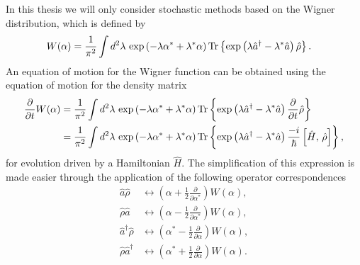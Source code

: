 In this thesis we will only consider stochastic methods based on the Wigner distribution, which is defined by \citep{Scully}
\begin{align}
    W(\alpha) &= \frac{1}{\pi^2} \int d^2 \lambda\, \exp\left(-\lambda \alpha^* + \lambda^* \alpha\right) \operatorname{Tr}\left\{ \exp\left(\lambda \hat{a}^\dagger - \lambda^* \hat{a}\right) \hat{\rho} \right\}.
\end{align}
An equation of motion for the Wigner function can be obtained using the equation of motion for the density matrix
\begin{align}
    \frac{\partial}{\partial t} W(\alpha) &= \frac{1}{\pi^2} \int d^2 \lambda\, \exp\left(-\lambda \alpha^* + \lambda^* \alpha\right) \operatorname{Tr}\left\{ \exp\left(\lambda \hat{a}^\dagger - \lambda^* \hat{a}\right) \frac{\partial}{\partial t}\hat{\rho}\right\} \notag \\
    &= \frac{1}{\pi^2} \int d^2 \lambda\, \exp\left(-\lambda \alpha^* + \lambda^* \alpha\right) \operatorname{Tr}\left\{ \exp\left(\lambda \hat{a}^\dagger - \lambda^* \hat{a}\right) \frac{-i}{\hbar} \left[\hat{H},\, \hat{\rho} \right]\right\},
\end{align}
for evolution driven by a Hamiltonian $\hat{H}$.  The simplification of this expression is made easier through the application of the following operator correspondences \citep[\S 4.5]{GardinerQN}
\begin{subequations}
    \begin{align}
        \hat{a} \hat{\rho} &\leftrightarrow \left(\alpha + \frac{1}{2} \frac{\partial}{\partial \alpha^*} \right) W(\alpha), \\
        \hat{\rho} \hat{a} & \leftrightarrow \left(\alpha - \frac{1}{2} \frac{\partial}{\partial \alpha^*} \right) W(\alpha), \\
        \hat{a}^\dagger \hat{\rho} & \leftrightarrow \left( \alpha^* - \frac{1}{2} \frac{\partial}{\partial \alpha} \right) W(\alpha), \\
        \hat{\rho} \hat{a}^\dagger & \leftrightarrow \left( \alpha^* + \frac{1}{2} \frac{\partial}{\partial \alpha} \right) W(\alpha).
    \end{align}
\end{subequations}

